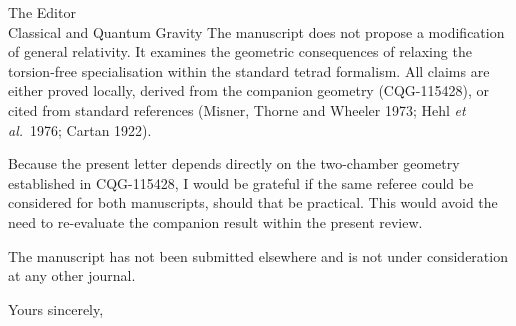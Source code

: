 \documentclass[11pt]{letter}
\begin{document}
\begin{letter}{The Editor\\Classical and Quantum Gravity}
The manuscript does not propose a modification of general
relativity. It examines the geometric consequences of
relaxing the torsion-free specialisation within the standard
tetrad formalism. All claims are either proved locally,
derived from the companion geometry (CQG-115428), or cited
from standard references (Misner, Thorne and Wheeler 1973;
Hehl \textit{et al.}\ 1976; Cartan 1922).

Because the present letter depends directly on the
two-chamber geometry established in CQG-115428, I would be
grateful if the same referee could be considered for both
manuscripts, should that be practical. This would avoid
the need to re-evaluate the companion result within the
present review.

The manuscript has not been submitted elsewhere and is not
under consideration at any other journal.

\closing{Yours sincerely,}

\end{letter}
\end{document}
